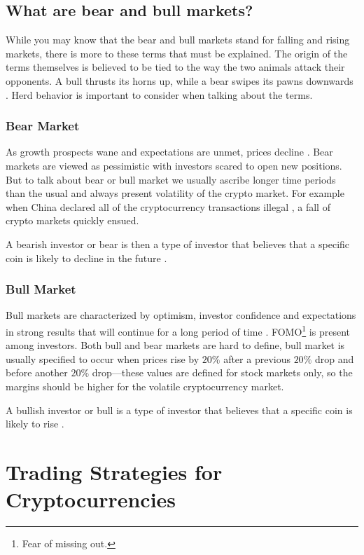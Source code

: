 \section{What are bear and bull markets?}
While you may know that the bear and bull markets stand for falling and rising markets, there is more to these terms that must be explained. The origin of the terms themselves is believed to be tied to the way the two animals attack their opponents. A bull thrusts its horns up, while a bear swipes its pawns downwards \cite{investopedia-bull-market}.
Herd behavior is important to consider when talking about the terms. 

\subsection*{Bear Market}
As growth prospects wane and expectations are unmet, prices decline \cite{investopedia-bear-market}. Bear markets are viewed as pessimistic with investors scared to open new positions. But to talk about bear or bull market we usually ascribe longer time periods than the usual and always present volatility of the crypto market. For example when China declared all of the cryptocurrency transactions illegal \cite{china-ban}, a fall of crypto markets quickly ensued. 

A bearish investor or bear is then a type of investor that believes that a specific coin is likely to decline in the future \cite{investopedia-bull}.

\subsection*{Bull Market}
Bull markets are characterized by optimism, investor confidence and expectations in strong results that will continue for a long period of time \cite{investopedia-bull-market}. FOMO\footnote{Fear of missing out.} is present among investors. Both bull and bear markets are hard to define, bull market is usually specified to occur when prices rise by $20\%$ after a previous $20\%$ drop and before another $20\%$ drop---these values are defined for stock markets only, so the margins should be higher for the volatile cryptocurrency market.

A bullish investor or bull is a type of investor that believes that a specific coin is likely to rise \cite{investopedia-bull}.

\chapter{Trading Strategies for Cryptocurrencies}
\label{trading-stategies}

